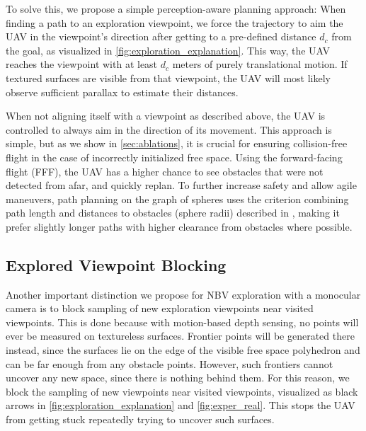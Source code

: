 \documentclass[letterpaper, 10 pt, journal, twoside]{IEEEtran}
\begin{document}
{To solve this, we propose a simple perception-aware planning approach: 
When finding a path to an exploration  viewpoint, we force the trajectory to aim the UAV in the viewpoint's direction after getting to a pre-defined distance $d_c$ from the goal, as visualized in \autoref{fig:exploration_explanation}.
This way, the UAV reaches the viewpoint with at least $d_c$ meters of {purely translational motion}.
If textured surfaces are visible from that viewpoint, the UAV will most likely observe sufficient parallax to estimate their distances.

{When not aligning itself with a viewpoint as described above,
the UAV is controlled to always aim in the direction of its movement.
This approach is simple, but as we show in \autoref{sec:ablations}, it is crucial for ensuring collision-free flight in the case of incorrectly initialized free space.
Using the forward-facing flight (FFF), the UAV has a higher chance to see obstacles that were not detected from afar, and quickly replan.
To further increase safety and allow agile maneuvers, path planning on the graph of spheres uses the criterion combining path length and distances to obstacles (sphere radii) described in \cite{spheremap}, making it prefer slightly longer paths with higher clearance from obstacles where possible.
}


\subsection{Explored Viewpoint Blocking}
\label{sec:blocking}
Another {important} distinction we propose for NBV exploration with a monocular camera is to block sampling of new exploration viewpoints near visited viewpoints.
{This is done because with motion-based depth sensing, no points will ever be measured on textureless surfaces.}
Frontier points will be generated there instead, since the surfaces lie on the edge of the visible free space polyhedron and can be far enough from any obstacle points.
However, such frontiers cannot uncover any new space, since there is nothing behind them.
For this reason, we block the sampling of new viewpoints near visited viewpoints, {visualized as black arrows in \autoref{fig:exploration_explanation} and \autoref{fig:exper_real}.}
This stops the UAV from getting stuck repeatedly trying to uncover such surfaces.


}
\end{document}
